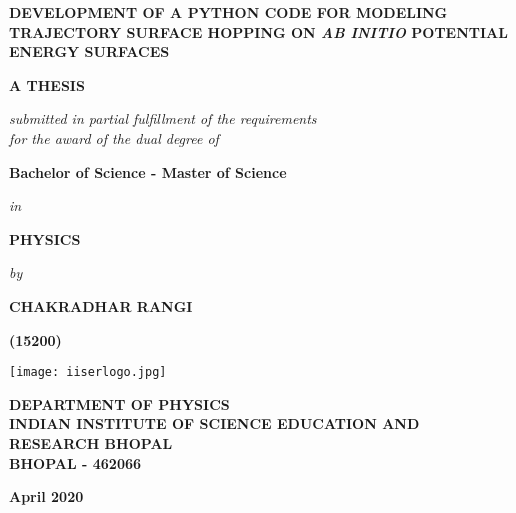 \begin{titlepage}
    \begin{center}
        \LARGE
        \textbf{\uppercase{Development of a Python code for modeling trajectory surface hopping on \textit{ab initio} potential energy surfaces}}
        
        \vspace{1cm}
        \Large
        \textbf{\uppercase{A Thesis}}
        
        \vspace{0.4cm}
        \normalsize{\emph{submitted in partial fulfillment of the requirements \\for the award of the dual degree of}}
        
        \vspace{0.5cm}
        \large
        \textbf{Bachelor of Science - Master of Science}
        
        \vspace{0.3cm}
        \normalsize{\emph{in}}
        
        \vspace{0.3cm}
        \large
        \textbf{\uppercase{Physics}}
        
        \vspace{0.3cm}
        \normalsize{\emph{by}}
        
        \vspace{0.3cm}
        \large
        \textbf{\uppercase{Chakradhar Rangi}}
        
        \vspace{0.2cm}
        \large
        \textbf{(15200)}
        
        \vspace{0.3cm}
        
        \texttt{[image: iiserlogo.jpg]}
        
        \vspace{0.5cm}
        \large
        \textbf{\uppercase{department of physics \\ Indian institute of Science education and research bhopal \\ bhopal - 462066}}
        
        \vspace{0.2cm}
        \large
        \textbf{April 2020}
        
    \end{center}
\end{titlepage}